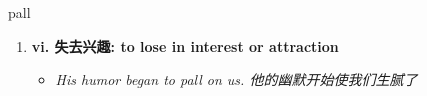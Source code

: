 
\begin{frame}
{\huge pall}
\begin{center}
\begin{enumerate}\Large
  \item \textbf{vi. 失去兴趣: to lose in interest or attraction}
  \begin{itemize}
    \item \em{\Large{His humor began to pall on us. 他的幽默开始使我们生腻了}}
  \end{itemize}
\end{enumerate}
\end{center}
\end{frame}
